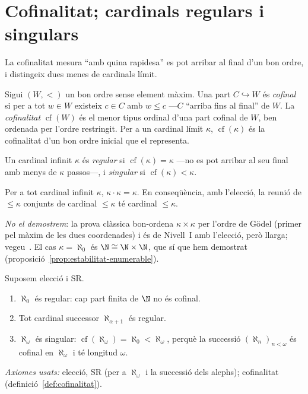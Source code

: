 \section{Cofinalitat; cardinals regulars i singulars}\label{sec:cofinalitat}

La cofinalitat mesura \enquote{amb quina rapidesa} es pot arribar al final d'un
bon ordre, i distingeix dues menes de cardinals límit.

\begin{definicio}[Cofinalitat]\label{def:cofinalitat}
Sigui \((W,<)\) un bon ordre sense element màxim. Una part \(C\hookrightarrow W\)
és \emph{cofinal} si per a tot \(w\in W\) existeix \(c\in C\) amb \(w\le c\)
---\(C\) \enquote{arriba fins al final} de \(W\). La \emph{cofinalitat}
\(\operatorname{cf}(W)\) és el menor tipus ordinal d'una part cofinal de \(W\),
ben ordenada per l'ordre restringit. Per a un cardinal límit \(\kappa\),
\(\operatorname{cf}(\kappa)\) és la cofinalitat d'un bon ordre inicial que el
representa.
\end{definicio}

\begin{definicio}\label{def:regular-singular}
Un cardinal infinit \(\kappa\) és \emph{regular} si \(\operatorname{cf}(\kappa)=\kappa\)
---no es pot arribar al seu final amb menys de \(\kappa\) passos---, i
\emph{singular} si \(\operatorname{cf}(\kappa)<\kappa\).
\end{definicio}

\begin{teorema}\label{teo:hessenberg}
Per a tot cardinal infinit \(\kappa\), \(\kappa\cdot\kappa=\kappa\). En
conseqüència, amb l'elecció, la reunió de \(\le\kappa\) conjunts de cardinal
\(\le\kappa\) té cardinal \(\le\kappa\).\par
\emph{No el demostrem}: la prova clàssica bon-ordena \(\kappa\times\kappa\)
per l'ordre de Gödel (primer pel màxim de les dues coordenades) i és de
Nivell~I amb l'elecció, però llarga; vegeu~\cite[teorema~3.5]{jech2003}. El
cas \(\kappa=\aleph_0\) és \(\N\cong\N\times\N\), que sí que hem demostrat
(proposició~\ref{prop:estabilitat-enumerable}).
\end{teorema}

\begin{proposicio}\label{prop:regular-exemples}
Suposem elecció i SR.
\begin{enumerate}
\item \(\aleph_0\) és regular: cap part finita de \(\N\) no és cofinal.
\item Tot cardinal successor \(\aleph_{\alpha+1}\) és regular.
\item \(\aleph_\omega\) és singular: \(\operatorname{cf}(\aleph_\omega)=\aleph_0<\aleph_\omega\),
perquè la successió \((\aleph_n)_{n<\omega}\) és cofinal en \(\aleph_\omega\) i
té longitud \(\omega\).
\end{enumerate}
\emph{Axiomes usats:} elecció, SR (per a \(\aleph_\omega\) i la successió dels
alephs); cofinalitat (definició~\ref{def:cofinalitat}).
\end{proposicio}

